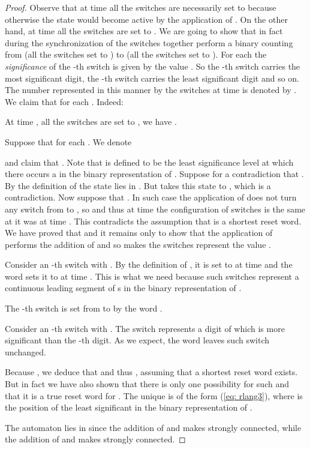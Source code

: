 \documentclass{ws-ijmpc}
\begin{document}
\begin{proof}
Observe that at time  all the switches are necessarily set to
 because otherwise the state 
would become active by the application of . On the other
hand, at time  all the switches are set to . We are
going to show that in fact during the synchronization of  the
switches together perform a binary counting from  (all the switches
set to ) to  (all the switches set to ).
For each  the\emph{ significance} of the -th switch is given
by the value . So the -th
switch carries the most significant digit, the -th
switch carries the least significant digit and so on. The number represented
in this manner by the switches at time  is denoted by .
We claim that  for each . Indeed:
\begin{itemlist}
\item At time , all the switches are set to , we have .
\item Suppose that  for each . We denote

and claim that . Note that 
is defined to be the least significance level at which there occurs
a  in the binary representation of .
Suppose for a contradiction that . By the
definition of  the state 
lies in . But
 takes this state to , which is
a contradiction. Now suppose that . In such
case the application of  does not turn any switch from
 to , so 
and thus at time  the configuration of switches is the same at
it was at time . This contradicts the assumption
that  is a shortest reset word. We have proved that 
and it remains only to show that the application of  performs
the addition of  and so makes the switches represent the value
.

\begin{itemlist}
\item Consider an -th switch with . By the
definition of , it is set to  at time
 and the word  sets it to  at time
. This is what we need because such switches represent a continuous
leading segment of s in the binary representation of
. 
\item The -th switch is set from 
to  by the word .
\item Consider an -th switch with . The
switch represents a digit of  which is more significant
than the -th digit. As we expect, the word 
leaves such switch unchanged.
\end{itemlist}
\end{itemlist}
Because , we deduce that  and thus
, assuming that a shortest
reset word  exists. But in fact we have also shown that there
is only one possibility for such  and that it is a true reset
word for . The unique  is of the form (\ref{eq: rlang3}),
where  is the position of the least significant \textbf{
}in the binary representation of .

The automaton  lies in 
since the addition of  and
 makes
 strongly connected, while the addition of 
and  makes
 strongly connected.
\end{proof}
\end{document}
